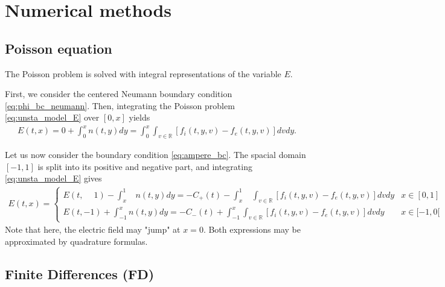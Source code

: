 \documentclass{article}
\numberwithin{equation}{section}
\newcommand{\R}{\mathbb{R}}
\begin{document}

\section{Numerical methods}

\subsection{Poisson equation}

The Poisson problem is solved with integral representations of the variable $E$.

First, we consider the centered Neumann boundary condition \cref{eq:phi_bc_neumann}. Then, integrating the Poisson problem \cref{eq:unsta_model_E} over $[0,x]$ yields
\begin{align}\label{eq:integral_representation_E_sym}
	E(t,x) = 0 + \int_0^x n(t,y) dy = \int_0^x \int_{v\in\R} [f_i(t,y,v) - f_e(t,y,v)] dv dy.
\end{align}

Let us now consider the boundary condition \cref{eq:ampere_bc}. The spacial domain $[-1,1]$ is split into its positive and negative part, and integrating \cref{eq:unsta_model_E} gives
\begin{align}\label{eq:integral_representation_E_naturalbc}
	E(t,x) = 
	\begin{cases}
	E(t,\phantom{-}1) - \int_{x\phantom{-}}^{1} n(t,y) dy = - C_{+}(t) - \int_{x\phantom{-}}^1 \int_{v\in\R} [f_i(t,y,v) - f_e(t,y,v)] dv dy & x \in [0,1] \\
	E(t,-1) + \int_{-1}^x n(t,y) dy = -C_{-}(t) + \int_{-1}^x \int_{v\in\R} [f_i(t,y,v) - f_e(t,y,v)] dv dy & x \in [-1,0[ 
	\end{cases}
\end{align}
Note that here, the electric field may "jump" at $x=0$. Both expressions may be approximated by quadrature formulas. 

\subsection{Finite Differences (FD)}
\end{document}
